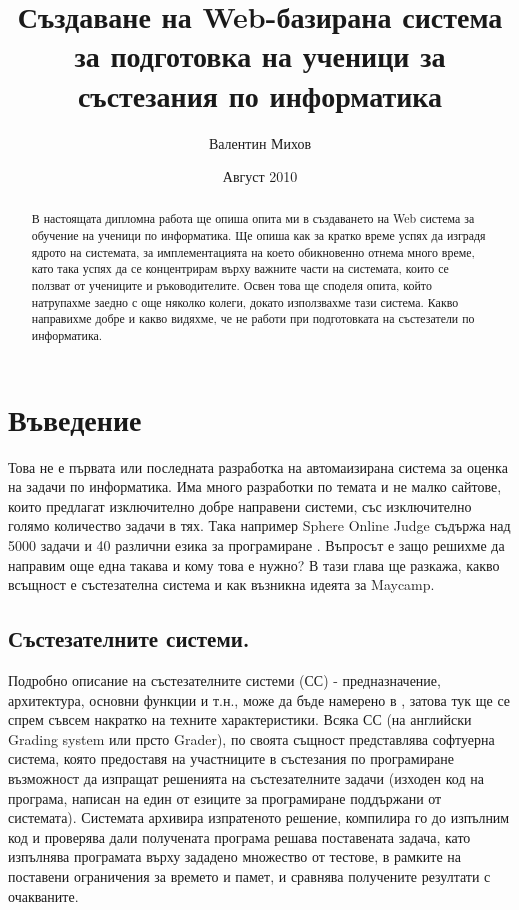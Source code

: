 \documentclass[a4paper,12pt]{article}
\begin{document}
  \title{Създаване на Web-базирана система за подготовка на ученици за състезания по информатика}
  \author{Валентин Михов}
  \date{Август 2010}
  
  \maketitle
  
  \begin{abstract}
    
    В настоящата дипломна работа ще опиша опита ми в създаването на Web система за обучение на ученици по информатика. Ще опиша как за кратко време успях да изградя ядрото на системата, за имплементацията на което обикновенно отнема много време, като така успях да се концентрирам върху важните части на системата, които се ползват от учениците и ръководителите. Освен това ще споделя опита, който натрупахме заедно с още няколко колеги, докато използвахме тази система. Какво направихме добре и какво видяхме, че не работи при подготовката на състезатели по информатика.
  \end{abstract}
  
  \newpage

  \tableofcontents
  
  \newpage
  
  \listoffigures
  
  \newpage
  
  \section{Въведение}
    Това не е първата или последната разработка на автомаизирана система за оценка на задачи по информатика. Има много разработки по темата и не малко сайтове, които предлагат изключително добре направени системи, със изключително голямо количество задачи в тях. Така например Sphere Online Judge съдържа над 5000 задачи и 40 различни езика за програмиране \cite{online_judge_list}. Въпросът е защо решихме да направим още една такава и кому това е нужно? В тази глава ще разкажа, какво всъщност е състезателна система и как възникна идеята за Maycamp.
    
    \subsection{Състезателните системи.} Подробно описание на състезателните системи (СС) - предназначение, архитектура, основни функции и т.н., може да бъде намерено в \cite{grading_sys_manev}, затова тук ще се спрем съвсем накратко на техните характеристики. Всяка СС (на английски Grading system или прсто Grader), по своята същност представлява софтуерна система, която предоставя на участниците в състезания по програмиране възможност да изпращат решенията на състезателните задачи (изходен код на програма, написан на един от езиците за програмиране поддържани от системата). Системата архивира изпратеното решение, компилира го до изпълним код и проверява дали получената програма решава поставената задача, като изпълнява програмата върху зададено множество от тестове, в рамките на поставени ограничения за времето и памет, и сравнява получените резултати с очакваните. 
\end{document}

